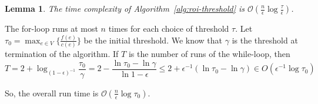 \documentclass[10pt]{article} %
\newtheorem{lemma}[theorem]{Lemma}
\theoremstyle{remark}
\newcommand{\OPT}{{\rm OPT}}
\begin{document}




\begin{lemma}
   \label{obs:unconstrained-time}
The time complexity of Algorithm~\ref{alg:roi-threshold} is $\mathcal{O}(\frac{n}{\epsilon}\log \frac{\tau}{\epsilon})$. 
\end{lemma}


The for-loop runs at most $n$ times for each choice of threshold $\tau$. Let $\tau_0 = \max_{e \in V}\{\frac{f(e)}{c(e)}\}$ be the initial threshold. We know that $\gamma$ is the threshold at termination of the algorithm. If $T$ is the number of runs of the while-loop, then
\[
T = 2+\log_{(1-\epsilon)^{-1}} \frac{\tau_0}{\gamma} = 2-\frac{\ln \tau_0-\ln \gamma}{\ln 1-\epsilon}
\leq 2+\epsilon^{-1} (\ln \tau_0 -\ln \gamma) \in O(\epsilon^{-1} \log \tau_0)
\]

So, the overall run time is $\mathcal{O}(\frac{n}{\epsilon}\log \tau_0)$.















\end{document}
